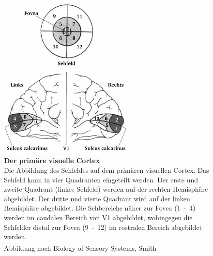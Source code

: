 \documentclass[12pt,a4paper,pdftex]{article}
\begin{document}
\begin{figure}[H]
    \centering
    \includegraphics[width = 0.6\textwidth]{pictures/visual/V1.png}
    \caption[Der primäre visuelle Cortex]{\textbf{Der primäre visuelle Cortex}\\
    Die Abbildung des Sehfeldes auf dem primären visuellen Cortex. Das Sehfeld kann in vier Quadranten eingeteilt werden. Der erste und zweite Quadrant (linkes Sehfeld) werden auf der rechten Hemisphäre abgebildet. Der dritte und vierte Quadrant wird auf der linken Hemisphäre abgebildet. Die Sehbereiche näher zur Fovea (1~-~4) werden im caudalen Bereich von V1 abgebildet, wohingegen die Sehfelder distal zur Fovea (9~-~12) im rostralen Bereich abgebildet werden.\\
    Abbildung nach Biology of Sensory Systems, Smith \textsuperscript{\cite[18]{smith2008biology}}}
    \label{fig:V1}
\end{figure}
\end{document}
